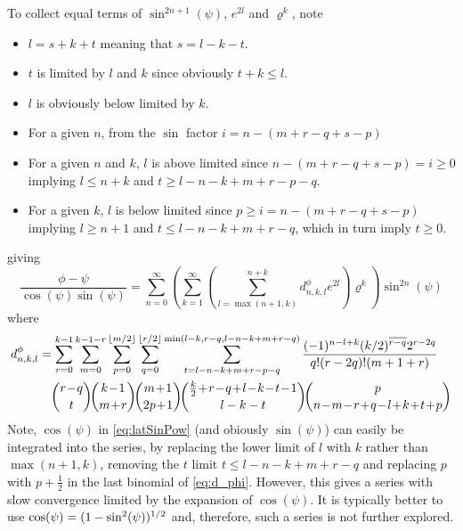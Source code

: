 \documentclass[a4paper]{amsart}
\begin{document}
To collect equal terms of $\sin^{2n+1}(\psi)$, $e^{2l}$ and $\varrho^{k}$, note
\begin{itemize}
\item $l=s+k+t$ meaning that $s=l-k-t$.
\item $t$ is limited by $l$ and $k$ since obviously $t+k\leq l$.
\item $l$ is obviously below limited by $k$.
\item For a given $n$, from the $\sin$ factor $i = n - (m+r-q+s-p)$
\item For a given $n$ and $k$, $l$ is above limited since $n - (m+r-q+s-p) = i \geq 0$ implying $l \leq n+k$ and $t\geq l-n-k+m+r-p-q$.
\item For a given $k$, $l$ is below limited since $p \geq i = n - (m+r-q+s-p)$ implying $l \geq n+1$ and $t\leq l-n-k+m+r-q$, which in turn imply $t\geq0$.
\end{itemize}
giving
\begin{equation}\label{eq:latSinPow}
\frac{\phi-\psi}{\cos(\psi)\sin(\psi)} =\sum_{n=0}^{\infty} \left(\sum_{k=1}^\infty\left(\sum_{l=\max(n+1,k)}^{n+k} d^\phi_{n,k,l} e^{2l}\right)\varrho^k\right)\sin^{2n}(\psi)
\end{equation}
where
\begin{align}
d^\phi_{n,k,l}&=\sum^{k-1}_{r=0}\sum^{k-1-r}_{m=0}\sum^{\lfloor m/2\rfloor}_{p=0}\sum_{q=0}^{\lfloor r/2\rfloor}\sum_{t=l-n-k+m+r-p-q}^{\min(l-k,r-q,l-n-k+m+r-q)}\frac{(-1)^{n-l+k}(k/2)^{\overline{r-q}}2^{r-2q}}{q!(r-2q)!(m+1+r)}\nonumber\\
&\quad\binom{r\!-\!q}{t}\!\binom{k\!-\!1}{m\!+\!r}\!\binom{m\!+\!1}{2p\!+\!1}\!\binom{\frac{k}{2}\!+\!r\!-\!q\!+\!l\!-\!k\!-\!t\!-\!1}{l-k-t}\!\binom{p}{n\!-\!m\!-\!r\!+\!q\!-\!l\!+\!k\!+\!t\!+\!p}\raisetag{-7mm}\label{eq:d_phi}
\end{align}
Note, $\cos(\psi)$ in \eqref{eq:latSinPow} (and obiously $\sin(\psi)$) can easily be integrated into the series, by replacing the lower limit of $l$ with $k$ rather than $\max(n+1,k)$, removing the $t$ limit $t\leq l-n-k+m+r-q$ and replacing $p$ with $p+\frac{1}{2}$ in the last binomial of \eqref{eq:d_phi}. However, this gives a series with slow convergence limited by the expansion of $\cos(\psi)$. It is typically better to use $\cos(\psi)=(1-\smash{\sin}^2(\psi))^{1/2}$ and, therefore, such a series is not further explored.
\end{document}
